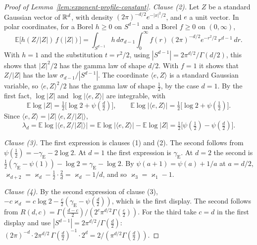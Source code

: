 \begin{proof}[Proof of Lemma~\ref{lem:exponent-profile-constant}]
\emph{Clause (2).} Let $Z$ be a standard Gaussian vector of $\mathbb{R}^d$, with density
$(2\pi)^{-d/2}e^{-|x|^2/2}$, and $e$ a unit vector. In polar coordinates, for a Borel
$h \ge 0$ on $S^{d-1}$ and a Borel $f \ge 0$ on $(0,\infty)$,
\[
  \mathbb{E}\bigl[h(Z/|Z|)\,f(|Z|)\bigr]
   = \int_{S^{d-1}}h\,d\sigma_{d-1}\int_0^\infty f(r)\,(2\pi)^{-d/2}e^{-r^2/2}\,r^{d-1}\,dr .
\]
With $h = 1$ and the substitution $t = r^2/2$, using $|S^{d-1}| = 2\pi^{d/2}/\Gamma(d/2)$, this
shows that $|Z|^2/2$ has the gamma law of shape $d/2$. With $f = 1$ it shows that $Z/|Z|$ has the
law $\sigma_{d-1}/|S^{d-1}|$. The coordinate $\langle e,Z\rangle$ is a standard Gaussian variable,
so $\langle e,Z\rangle^2/2$ has the gamma law of shape $\tfrac12$, by the case $d = 1$. By the
first fact, $\log|Z|$ and $\log|\langle e,Z\rangle|$ are integrable, with
\[
  \mathbb{E}\log|Z| = \tfrac12\bigl[\log 2 + \psi(\tfrac d2)\bigr], \qquad
  \mathbb{E}\log|\langle e,Z\rangle| = \tfrac12\bigl[\log 2 + \psi(\tfrac12)\bigr] .
\]
Since $\langle e,Z\rangle = |Z|\,\langle e, Z/|Z|\rangle$,
\[
  \lambda_d = \mathbb{E}\log\bigl|\langle e, Z/|Z|\rangle\bigr|
   = \mathbb{E}\log|\langle e,Z\rangle| - \mathbb{E}\log|Z|
   = \tfrac12\bigl[\psi(\tfrac12) - \psi(\tfrac d2)\bigr] .
\]

\emph{Clause (3).} The first expression is clauses (1) and (2). The second follows from
$\psi(\tfrac12) = -\gamma_{\mathrm E} - 2\log 2$. At $d = 1$ the first expression is
$\gamma_{\mathrm E}$. At $d = 2$ the second is
$\tfrac12(\gamma_{\mathrm E} - \psi(1)) - \log 2 = \gamma_{\mathrm E} - \log 2$. By
$\psi(a+1) = \psi(a) + 1/a$ at $a = d/2$,
$\varkappa_{d+2} = \varkappa_d - \tfrac12\cdot\tfrac2d = \varkappa_d - 1/d$, and so
$\varkappa_3 = \varkappa_1 - 1$.

\emph{Clause (4).} By the second expression of clause (3),
$-c\varkappa_d = c\log 2 - \tfrac c2(\gamma_{\mathrm E} - \psi(\tfrac d2))$, which is the first
display. The second follows from
$R(d,c) = \Gamma(\tfrac{d-c}{2})/(2^{c}\pi^{d/2}\Gamma(\tfrac c2))$. For the third take $c = d$
in the first display and use $|S^{d-1}| = 2\pi^{d/2}/\Gamma(\tfrac d2)$:
$(2\pi)^{-d}\cdot 2\pi^{d/2}\,\Gamma(\tfrac d2)^{-1}\cdot 2^{d} = 2/(\pi^{d/2}\Gamma(\tfrac d2))$.
\end{proof}

